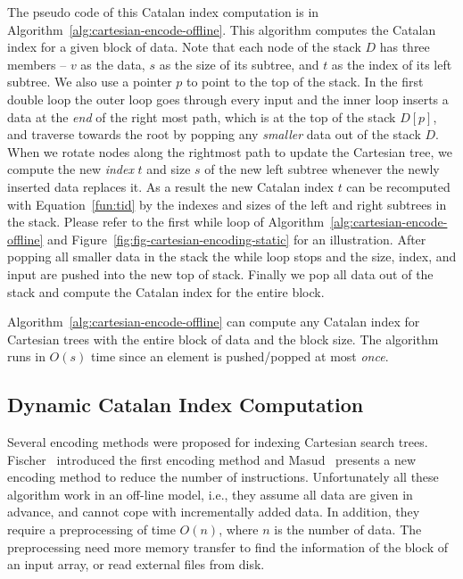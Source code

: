 The pseudo code of this Catalan index computation is in
Algorithm~\ref{alg:cartesian-encode-offline}.  This algorithm computes
the Catalan index for a given block of data.  Note that each node of
the stack $D$ has three members -- $v$ as the data, $s$ as the size of
its subtree, and $t$ as the index of its left subtree.  We also use a
pointer $p$ to point to the top of the stack.  In the first double
loop the outer loop goes through every input and the inner loop
inserts a data at the {\em end} of the right most path, which is at
the top of the stack $D[p]$, and traverse towards the root by popping
any {\em smaller} data out of the stack $D$.  When we rotate nodes
along the rightmost path to update the Cartesian tree, we compute the
new {\em index} $t$ and size $s$ of the new left subtree whenever the
newly inserted data replaces it.  As a result the new Catalan index
$t$ can be recomputed with Equation~\ref{fun:tid} by the indexes and
sizes of the left and right subtrees in the stack.  Please refer to
the first while loop of Algorithm~\ref{alg:cartesian-encode-offline}
and Figure~\ref{fig:fig-cartesian-encoding-static} for an
illustration.  After popping all smaller data in the stack the while
loop stops and the size, index, and input are pushed into the new top
of stack.  Finally we pop all data out of the stack and compute the
Catalan index for the entire block.

Algorithm~\ref{alg:cartesian-encode-offline} can compute any Catalan
index for Cartesian trees with the entire block of data and the block
size.  The algorithm runs in $O(s)$ time since an element is
pushed/popped at most {\em once}.



\subsection{Dynamic Catalan Index Computation}

Several encoding methods were proposed for indexing Cartesian search
trees.  Fischer~\cite{Fischer2006TheoreticalAP} introduced the first
encoding method and Masud~\cite{Hasan2010CacheOA} presents a new
encoding method to reduce the number of instructions.  Unfortunately
all these algorithm work in an off-line model, i.e., they assume all
data are given in advance, and cannot cope with incrementally added
data.  In addition, they require a preprocessing of time $O(n)$, where
$n$ is the number of data.  The preprocessing need more memory
transfer to find the information of the block of an input array, or
read external files from disk.

